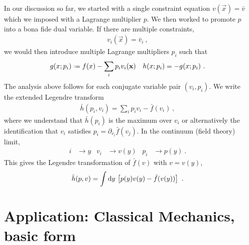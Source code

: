 In our discussion so far, we started with a single constraint equation $v(\vec{x})=\bar v$ which we imposed with a Lagrange multiplier $p$. We then worked to promote $p$ into a bona fide dual variable. If there are multiple constraints,
\begin{align}
    v_i(\vec{x}) = \bar v_i \ ,
\end{align}
we would then introduce multiple Lagrange multipliers $p_i$ such that
\begin{align}
    g(x;p_i) &\defeq f(x) -  \sum_i p_i v_i(\vec{x}) 
    &
    h(x;p_i) = -g(x;p_i)
    \ .
\end{align}
The analysis above follows for each conjugate variable pair $(v_i, p_i)$. We write the extended Legendre transform
\begin{align}
     \bar h(p_i, v_i) = \sum_i p_i v_i - \bar f(v_i) \ ,
 \end{align}
 where we understand that $\bar h(p_i)$ is the maximum over $v_i$ or alternatively the identification that $v_i$ satisfies $p_i = \partial_{v_i} \bar f(v_j)$. 
 In the continuum (field theory) limit, 
 \begin{align}
     i&\to y
     &
     v_i &\to v(y)
     &
     p_i &\to p(y) \ .
 \end{align}
 This gives the Legendre transformation of $\bar f(v)$ with $v=v(y)$,
 \begin{align}
     \bar h(p, v) = \int \operatorname{d}\mkern-3mu^{}\mkern-1mu{y} \, \left[p(y) v(y) - \bar f(v(y))\right] \ .
 \end{align}


\section{Application: Classical Mechanics, basic form}

